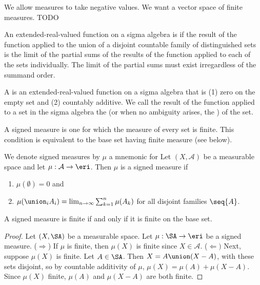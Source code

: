 
\sbasic



\sstart



We allow measures to take
negative values.
We want a vector space
of finite measures.
TODO


An extended-real-valued
function on a
sigma algebra is
if the result of the function applied to
the union of a disjoint countable family of
distinguished sets is the limit of the partial
sums of the results of the function applied
to each of the sets individually.
The limit of the partial sums must
exist irregardless of the summand order.

A
is an extended-real-valued
function on a
sigma algebra that is
(1) zero on the empty set and
(2) countably additive.
We call the result of the function
applied to a set in the sigma
algebra the
(or when no ambiguity arises, the
)
of the set.

A
signed measure is one for
which the measure of every set
is finite.
This condition is equivalent
to the base set having finite
measure (see below).


We denote signed measures by $\mu$
a mnemonic for 
Let
$(X, \mathcal{A})$
be a measurable space
and let
$\mu: \mathcal{A} \to \eri$.
Then $\mu$ is a signed measure if
\begin{enumerate}
  \item $\mu(\emptyset) = 0$ and
  \item
  $\mu(\union_{i} A_i) =
    \lim_{n \to \infty}
      \sum_{k = 1}^{n} \mu(A_k)$
  for all disjoint families $\seq{A}$.
\end{enumerate}


\begin{prop}
\label{prop:finitesignedmeasures}
A signed measure is finite
if and only if it is finite
on the base set.

\begin{proof}
Let $(X,\SA)$ be a measurable space.
Let $\mu: \SA \to \eri$ be a signed measure.
($\Rightarrow$) If $\mu$ is finite, then $\mu(X)$
is finite since $X \in \mathcal{A}$.
($\Leftarrow)$
Next, suppose $\mu(X)$ is finite.
Let $A \in \SA$.
Then $X = A \union (X - A)$,
with these sets disjoint,
so by countable additivity
of $\mu$,
$\mu(X) = \mu(A) + \mu(X - A)$.
Since $\mu(X)$ finite, $\mu(A)$
and $\mu(X - A)$ are both finite.
\end{proof}
\end{prop}

